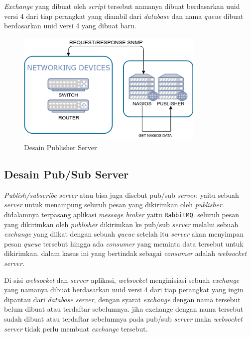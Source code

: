 			\textit{Exchange} yang dibuat oleh \textit{script} tersebut namanya dibuat berdasarkan uuid versi 4 dari tiap perangkat yang diambil dari \textit{database} dan nama \textit{queue} dibuat berdasarkan uuid versi 4 yang dibuat baru.
			
			\begin{figure}[H]
				\centering
				\includegraphics[width=9cm]{Images/C-3/desainpublisher.png}
				\caption{Desain Publisher Server}
				\label{desain:desainpublisher}
			\end{figure}
                
		\subsection{Desain Pub/Sub Server}
			\textit{Publish/subscribe} \textit{server} atau bisa juga disebut pub/sub \textit{server}. yaitu sebuah \textit{server} untuk menampung seluruh pesan yang dikirimkan oleh \textit{publisher}. didalamnya terpasang aplikasi \textit{message broker} yaitu \texttt{RabbitMQ}. seluruh pesan yang dikirimkan oleh \textit{publisher} dikirimkan ke pub/sub \textit{server} melalui sebuah \textit{exchange} yang diikat dengan sebuah \textit{queue} setelah itu \textit{server} akan menyimpan pesan \textit{queue} tersebut hingga ada \textit{consumer} yang meminta data tersebut untuk dikirimkan. dalam kasus ini yang bertindak sebagai \textit{consumer} adalah \textit{websocket server}.
			
			Di sisi \textit{websocket} dan \textit{server} aplikasi, \textit{websocket} menginisiasi sebuah \textit{exchange} yang namanya dibuat berdasarkan uuid versi 4 dari tiap perangkat yang ingin dipantau dari \textit{database server}, dengan syarat \textit{exchange} dengan nama tersebut belum dibuat atau terdaftar sebelumnya. jika exchange dengan nama tersebut sudah dibuat atau terdaftar sebelumnya pada pub/sub \textit{server} maka \textit{websocket} \textit{server} tidak perlu membuat \textit{exchange} tersebut.
			
